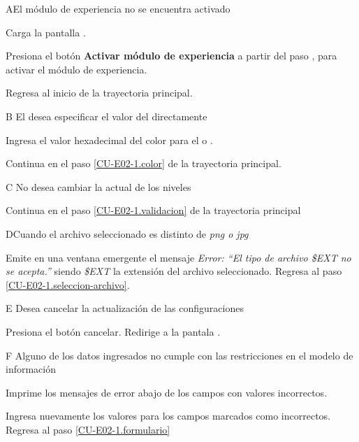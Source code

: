 \begin{UCtrayectoriaA}{A}{El módulo de experiencia no se encuentra activado}

  \Sistema Carga la pantalla .

  \Actor Presiona el botón {\bf Activar módulo de experiencia}
   a partir del paso \label{CU-E02-ir-a-formulario},
                     para activar el módulo de experiencia.

  \Sistema Regresa al inicio de la trayectoria principal.
           
\end{UCtrayectoriaA}

\begin{UCtrayectoriaA}{B}{%
El  desea especificar el valor del 
directamente}

    \Actor Ingresa el valor hexadecimal del color para el 
            o 
           .

    \Sistema Continua en el paso \ref{CU-E02-1.color} de la trayectoria principal.

\end{UCtrayectoriaA}

\begin{UCtrayectoriaA}{C}{%
No desea cambiar la  actual de los niveles}

    \Sistema Continua en el paso \ref{CU-E02-1.validacion} de la trayectoria principal
\end{UCtrayectoriaA}

\begin{UCtrayectoriaA}{D}{Cuando el archivo seleccionado es distinto de {\it png o jpg}}

  \Sistema Emite en una ventana emergente el mensaje {\it Error: ``El tipo de
           archivo \$EXT no se acepta.''} siendo {\it\$EXT} la extensión del
           archivo seleccionado.
  \Sistema Regresa al paso \ref{CU-E02-1.seleccion-archivo}.

\end{UCtrayectoriaA}

\begin{UCtrayectoriaA}{E}{%
Desea cancelar la actualización de las configuraciones}

  \Actor Presiona el botón cancelar.
  \Sistema Redirige a la pantala .

\end{UCtrayectoriaA}

\begin{UCtrayectoriaA}{F}{%
Alguno de los datos ingresados no cumple con las restricciones en el modelo de
información}

    \Sistema Imprime los mensajes de error abajo de los campos con valores incorrectos.

    \Actor Ingresa nuevamente los valores para los campos marcados como incorrectos.
    \Sistema Regresa al paso \ref{CU-E02-1.formulario}

\end{UCtrayectoriaA}

